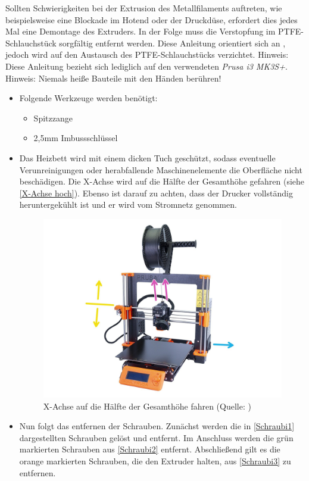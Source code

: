 Sollten Schwierigkeiten bei der Extrusion des Metallfilaments auftreten, wie beispielsweise eine Blockade im Hotend oder der Druckdüse, erfordert dies jedes Mal eine Demontage des Extruders. In der Folge muss die Verstopfung im PTFE-Schlauchstück sorgfältig entfernt werden. Diese Anleitung orientiert sich an \Autocite{Prusa}, jedoch wird auf den Austausch des PTFE-Schlauchstücks verzichtet.
Hinweis: Diese Anleitung bezieht sich lediglich auf den verwendeten \textit{Prusa i3 MK3S+}.\\
Hinweis: Niemals heiße Bauteile mit den Händen berühren!
\begin{itemize}
  \item Folgende Werkzeuge werden benötigt:
    \begin{itemize}
      \item Spitzzange
      \item 2,5mm Imbussschlüssel
    \end{itemize}
    \item Das Heizbett wird mit einem dicken Tuch geschützt, sodass eventuelle Verunreinigungen oder herabfallende Maschinenelemente die Oberfläche nicht beschädigen. Die X-Achse wird auf die Hälfte der Gesamthöhe gefahren (siehe \autoref{X-Achse hoch}). Ebenso ist darauf zu achten, dass der Drucker vollständig heruntergekühlt ist und er wird vom Stromnetz genommen.
      \begin{figure}[h]
        \centering
        \includegraphics[width=0.5\linewidth]{bilder/Anleitung - X-Achse hoch.jpg}
              \caption[Anleitung: X-Achse auf die Hälfte der Gesamthöhe fahren] { X-Achse auf die Hälfte der Gesamthöhe fahren (Quelle: \autocite{Prusa})}
        \label{X-Achse hoch}
      \end{figure}
      \FloatBarrier
    \item Nun folgt das entfernen der Schrauben. Zunächst werden die in \autoref{Schraubi1} dargestellten Schrauben gelöst und entfernt. Im Anschluss werden die grün markierten Schrauben aus \autoref{Schraubi2} entfernt. Abschließend gilt es die orange markierten Schrauben, die den Extruder halten, aus \autoref{Schraubi3} zu entfernen.

\end{itemize}
